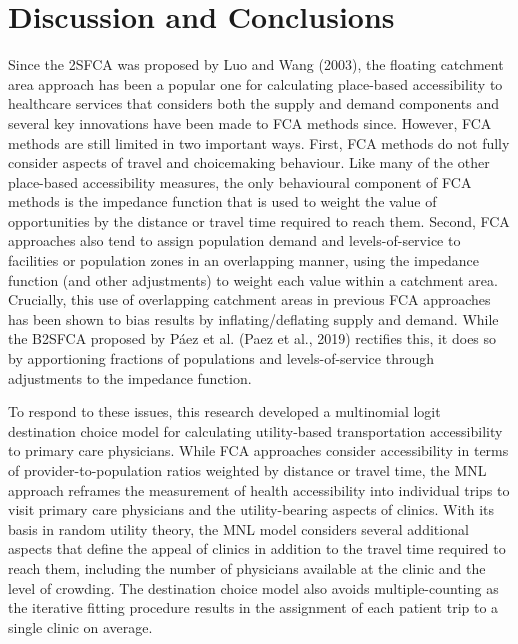 \documentclass[]{elsarticle} %
\begin{document}
\hypertarget{discussion-and-conclusions}{%
\section{Discussion and Conclusions}\label{discussion-and-conclusions}}

Since the 2SFCA was proposed by Luo and Wang (2003), the floating
catchment area approach has been a popular one for calculating
place-based accessibility to healthcare services that considers both the
supply and demand components and several key innovations have been made
to FCA methods since. However, FCA methods are still limited in two
important ways. First, FCA methods do not fully consider aspects of
travel and choicemaking behaviour. Like many of the other place-based
accessibility measures, the only behavioural component of FCA methods is
the impedance function that is used to weight the value of opportunities
by the distance or travel time required to reach them. Second, FCA
approaches also tend to assign population demand and levels-of-service
to facilities or population zones in an overlapping manner, using the
impedance function (and other adjustments) to weight each value within a
catchment area. Crucially, this use of overlapping catchment areas in
previous FCA approaches has been shown to bias results by
inflating/deflating supply and demand. While the B2SFCA proposed by Páez
et al. (Paez et al., 2019) rectifies this, it does so by apportioning
fractions of populations and levels-of-service through adjustments to
the impedance function.

To respond to these issues, this research developed a multinomial logit
destination choice model for calculating utility-based transportation
accessibility to primary care physicians. While FCA approaches consider
accessibility in terms of provider-to-population ratios weighted by
distance or travel time, the MNL approach reframes the measurement of
health accessibility into individual trips to visit primary care
physicians and the utility-bearing aspects of clinics. With its basis in
random utility theory, the MNL model considers several additional
aspects that define the appeal of clinics in addition to the travel time
required to reach them, including the number of physicians available at
the clinic and the level of crowding. The destination choice model also
avoids multiple-counting as the iterative fitting procedure results in
the assignment of each patient trip to a single clinic on average.
\end{document}
